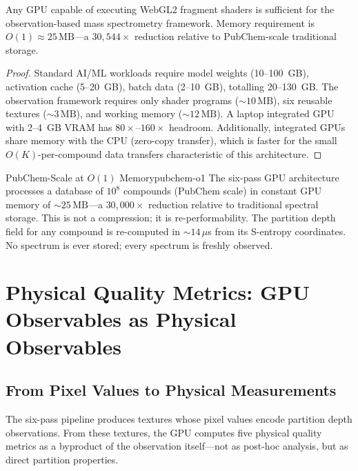 \begin{theorem}
\label{thm:ch22-hardware}
  Any GPU capable of executing WebGL2 fragment shaders is sufficient for
  the observation-based mass spectrometry framework.  Memory requirement is
  $O(1) \approx 25\,\mathrm{MB}$---a $30{,}544\times$ reduction relative
  to PubChem-scale traditional storage.
\end{theorem}

\begin{proof}
  Standard AI/ML workloads require model weights (10--100~GB), activation
  cache (5--20~GB), batch data (2--10~GB), totalling 20--130~GB.  The
  observation framework requires only shader programs (${\sim}10\,\mathrm{MB}$),
  six reusable textures (${\sim}3\,\mathrm{MB}$), and working memory
  (${\sim}12\,\mathrm{MB}$).  A laptop integrated GPU with 2--4~GB VRAM has
  $80\times$--$160\times$ headroom.  Additionally, integrated GPUs share memory
  with the CPU (zero-copy transfer), which is faster for the small
  $O(K)$-per-compound data transfers characteristic of this architecture.
\end{proof}

\begin{consequence}{PubChem-Scale at $O(1)$ Memory}{pubchem-o1}
  The six-pass GPU architecture processes a database of $10^8$ compounds
  (PubChem scale) in constant GPU memory of ${\sim}25\,\mathrm{MB}$---a
  $30{,}000\times$ reduction relative to traditional spectral storage.
  This is not a compression; it is re-performability.  The partition depth
  field for any compound is re-computed in ${\sim}14\,\mu$s from its
  S-entropy coordinates.  No spectrum is ever stored; every spectrum is
  freshly observed.
\end{consequence}

\section{Physical Quality Metrics: GPU Observables as Physical Observables}
\label{sec:ch22-quality}

\subsection{From Pixel Values to Physical Measurements}

The six-pass pipeline produces textures whose pixel values encode partition
depth observations.  From these textures, the GPU computes five physical
quality metrics as a byproduct of the observation itself---not as post-hoc
analysis, but as direct partition properties.

